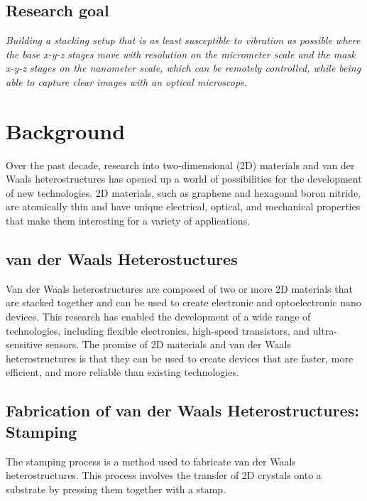 \documentclass[11pt]{article}
\begin{document}
\subsection{Research goal}
\begin{center}
    \textit{Building a stacking setup that is as least susceptible to vibration as possible where the base x-y-z stages move with resolution on the micrometer scale and the mask x-y-z stages on the nanometer scale, which can be remotely controlled, while being able to capture clear images with an optical microscope.}
\end{center}

\clearpage

\section{Background}
Over the past decade, research into two-dimensional (2D) materials and van der Waals heterostructures has opened up a world of possibilities for the development of new technologies. 2D materials, such as graphene and hexagonal boron nitride, are atomically thin and have unique electrical, optical, and mechanical properties that make them interesting for a variety of applications.

\subsection{van der Waals Heterostuctures}

Van der Waals heterostructures are composed of two or more 2D materials that are stacked together and can be used to create electronic and optoelectronic nano devices. 
This research has enabled the development of a wide range of technologies, including flexible electronics, high-speed transistors, and ultra-sensitive sensors. 
The promise of 2D materials and van der Waals heterostructures is that they can be used to create devices that are faster, more efficient, and more reliable than existing technologies.\\

 \subsection{Fabrication of van der Waals Heterostructures: Stamping}
 The stamping process is a method used to fabricate van der Waals heterostructures.
 This process involves the transfer of 2D crystals onto a substrate by pressing them together with a stamp. 
\end{document}
